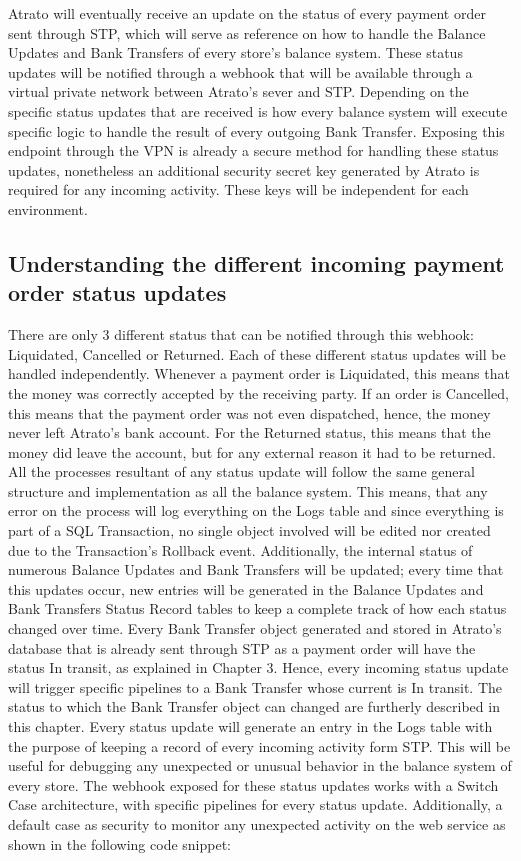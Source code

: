Atrato will eventually receive an update on the status of every payment order sent through STP, which will serve as reference on how to handle the Balance Updates and Bank Transfers of every store’s balance system.
These status updates will be notified through a webhook that will be available through a virtual private network between Atrato’s sever and STP. Depending on the specific status updates that are received is how every balance system will execute specific logic to handle the result of every outgoing Bank Transfer.
Exposing this endpoint through the VPN is already a secure method for handling these status updates, nonetheless an additional security secret key generated by Atrato is required for any incoming activity. These keys will be independent for each environment.

\subsection{Understanding the different incoming payment order status updates}

There are only 3 different status that can be notified through this webhook: Liquidated, Cancelled or Returned.
Each of these different status updates will be handled independently. Whenever a payment order is Liquidated, this means that the money was correctly accepted by the receiving party. If an order is Cancelled, this means that the payment order was not even dispatched, hence, the money never left Atrato’s bank account. For the Returned status, this means that the money did leave the account, but for any external reason it had to be returned.
All the processes resultant of any status update will follow the same general structure and implementation as all the balance system. This means, that any error on the process will log everything on the Logs table and since everything is part of a SQL Transaction, no single object involved will be edited nor created due to the Transaction’s Rollback event. Additionally, the internal status of numerous Balance Updates and Bank Transfers will be updated; every time that this updates occur, new entries will be generated in the Balance Updates and Bank Transfers Status Record tables to keep a complete track of how each status changed over time.
Every Bank Transfer object generated and stored in Atrato’s database that is already sent through STP as a payment order will have the status In transit, as explained in Chapter 3. Hence, every incoming status update will trigger specific pipelines to a Bank Transfer whose current is In transit. The status to which the Bank Transfer object can changed are furtherly described in this chapter.
Every status update will generate an entry in the Logs table with the purpose of keeping a record of every incoming activity form STP. This will be useful for debugging any unexpected or unusual behavior in the balance system of every store.
The webhook exposed for these status updates works with a Switch Case architecture, with specific pipelines for every status update. Additionally, a default case as security to monitor any unexpected activity on the web service as shown in the following code snippet:

